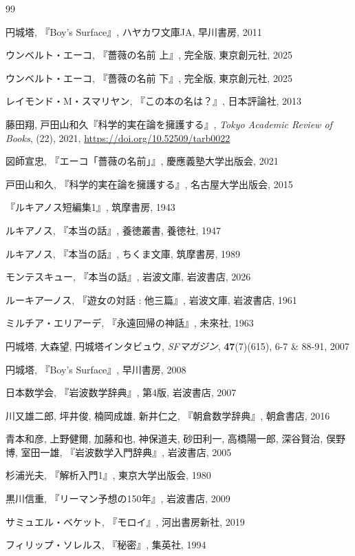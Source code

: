 \documentclass[10pt, a5paper, twoside]{ltjsarticle}
\begin{document}
	\begin{thebibliography}{99}

		 円城塔, 『Boy's Surface』, ハヤカワ文庫JA, 早川書房, 2011

         ウンベルト・エーコ, 『薔薇の名前 上』, 完全版, 東京創元社, 2025

         ウンベルト・エーコ, 『薔薇の名前 下』, 完全版, 東京創元社, 2025

         レイモンド・M・スマリヤン, 『この本の名は？』, 日本評論社, 2013

         藤田翔, 戸田山和久『科学的実在論を擁護する』, \textit{Tokyo Academic Review of Books}, (22), 2021, \url{https://doi.org/10.52509/tarb0022}

         図師宣忠, 『エーコ「薔薇の名前」』, 慶應義塾大学出版会, 2021

         戸田山和久, 『科学的実在論を擁護する』, 名古屋大学出版会, 2015

         『ルキアノス短編集1』, 筑摩書房, 1943

         ルキアノス, 『本当の話』, 養徳叢書, 養徳社, 1947

         ルキアノス, 『本当の話』, ちくま文庫, 筑摩書房, 1989

         モンテスキュー, 『本当の話』, 岩波文庫, 岩波書店, 2026

         ルーキアーノス, 『遊女の対話 : 他三篇』, 岩波文庫, 岩波書店, 1961

         ミルチア・エリアーデ, 『永遠回帰の神話』, 未來社, 1963

         円城塔, 大森望, 円城塔インタビュウ, \textit{SFマガジン}, \textbf{47}(7)(615), 6-7 \& 88-91, 2007

         円城塔, 『Boy's Surface』, 早川書房, 2008

         日本数学会, 『岩波数学辞典』, 第4版, 岩波書店, 2007

         川又雄二郎, 坪井俊, 楠岡成雄, 新井仁之, 『朝倉数学辞典』, 朝倉書店, 2016

         青本和彦, 上野健爾, 加藤和也, 神保道夫, 砂田利一, 高橋陽一郎, 深谷賢治, 俣野博, 室田一雄, 『岩波数学入門辞典』, 岩波書店, 2005

         杉浦光夫, 『解析入門1』, 東京大学出版会, 1980

         黒川信重, 『リーマン予想の150年』, 岩波書店, 2009

         サミュエル・ベケット, 『モロイ』, 河出書房新社, 2019

         フィリップ・ソレルス, 『秘密』, 集英社, 1994

    \end{thebibliography}
\end{document}
